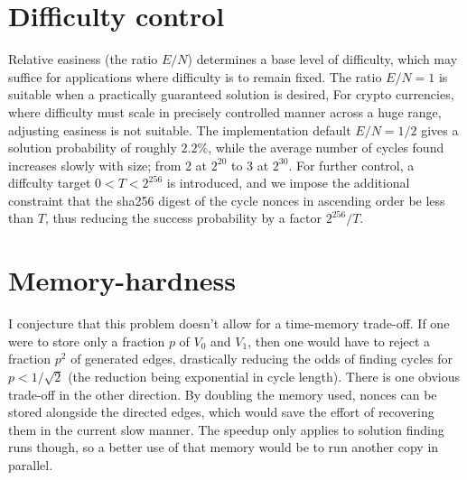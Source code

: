 \documentclass[11pt, oneside]{article}
\begin{document}
\begin{center}
\end{center}

\section{Difficulty control}
Relative easiness (the ratio $E/N$) determines a base level of difficulty,
which may suffice for applications where difficulty is to remain fixed.
The ratio $E/N=1$ is suitable when a practically guaranteed solution is desired,
For crypto currencies, where difficulty must scale in precisely
controlled manner across a huge range, adjusting easiness is not suitable.
The implementation default $E/N=1/2$ gives a solution probability of roughly $2.2\%$,
while the average number of cycles found increases slowly with size; from 2 at $2^{20}$
to 3 at $2^{30}$.
For further control, a diffculty target $0 < T < 2^{256}$ is introduced,
and we impose the additional constraint that the sha256 digest of the
cycle nonces in ascending order be less than $T$, thus
reducing the success probability by a factor $2^{256}/T$.

\section{Memory-hardness}
I conjecture that this problem doesn't allow for a time-memory trade-off. If
one were to store only a fraction $p$ of $V_0$ and $V_1$, then one would have
to reject a fraction $p^2$ of generated edges, drastically reducing the odds of
finding cycles for $p<1/\sqrt{2}$ (the reduction being exponential in cycle length).
There is one obvious trade-off in the other direction. By doubling the memory
used, nonces can be stored alongside the directed edges, which would save the
effort of recovering them in the current slow manner. The speedup only
applies to solution finding runs though, so a better use of that memory would be to run
another copy in parallel.
\end{document}
